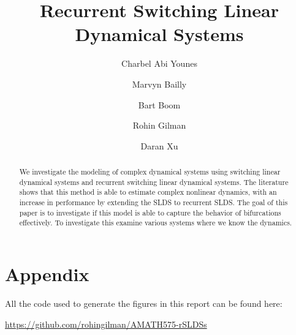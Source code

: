 \documentclass{amsart}
\title{Recurrent Switching Linear Dynamical Systems}
\author{Charbel Abi Younes \and Marvyn Bailly \and Bart Boom \and Rohin Gilman \and Daran Xu}
\date{}
\begin{document}
\begin{abstract}
	We investigate the modeling of complex dynamical systems using switching linear dynamical systems and recurrent switching linear dynamical systems. The literature shows that this method is able to estimate complex nonlinear dynamics, with an increase in performance by extending the SLDS to recurrent SLDS. The goal of this paper is to investigate if this model is able to capture the behavior of bifurcations effectively. To investigate this examine various systems where we know the dynamics. 
\end{abstract}

\maketitle









\nocite{linderman_bayesian_2017, zoltowski_unifying_2020, chen_estimating_2015, blei_variational_2017, linderman_dependent_2015}


\section{Appendix}

All the code used to generate the figures in this report can be found here: 

\href{https://github.com/rohingilman/AMATH575-rSLDSs}{https://github.com/rohingilman/AMATH575-rSLDSs}


\end{document}
